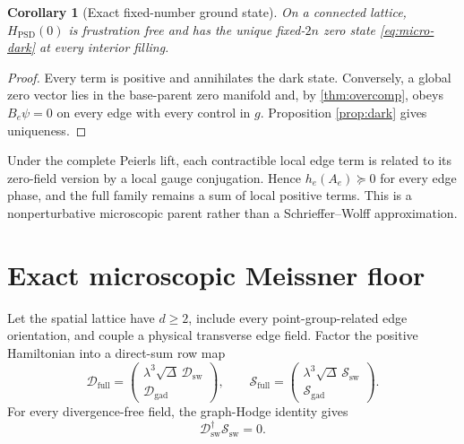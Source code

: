 \documentclass[11pt]{article}
\newtheorem{corollary}[theorem]{Corollary}
\theoremstyle{definition}
\theoremstyle{remark}
\newcommand{\cD}{\mathcal D}
\newcommand{\cS}{\mathcal S}
\begin{document}
\begin{corollary}[Exact fixed-number ground state]
\label{cor:PSD-ground}
On a connected lattice, $H_{\mathrm{PSD}}(0)$ is frustration free and has the unique fixed-$2n$ zero state \eqref{eq:micro-dark} at every interior filling.
\end{corollary}

\begin{proof}
Every term is positive and annihilates the dark state.  Conversely, a global zero vector lies in the base-parent zero manifold and, by \cref{thm:overcomp}, obeys $B_e\psi=0$ on every edge with every control in $g$.  Proposition \ref{prop:dark} gives uniqueness.
\end{proof}

Under the complete Peierls lift, each contractible local edge term is related to its zero-field version by a local gauge conjugation.  Hence $h_e(A_e)\succeq0$ for every edge phase, and the full family remains a sum of local positive terms.  This is a nonperturbative microscopic parent rather than a Schrieffer--Wolff approximation.

\section{Exact microscopic Meissner floor}

Let the spatial lattice have $d\ge2$, include every point-group-related edge orientation, and couple a physical transverse edge field.  Factor the positive Hamiltonian into a direct-sum row map
\begin{equation}
 \cD_{\mathrm{full}}=
 \begin{pmatrix}
 \lambda^3\sqrt\Delta\,\cD_{\mathrm{sw}}\\
 \cD_{\mathrm{gad}}
 \end{pmatrix},
 \qquad
 \cS_{\mathrm{full}}=
 \begin{pmatrix}
 \lambda^3\sqrt\Delta\,\cS_{\mathrm{sw}}\\
 \cS_{\mathrm{gad}}
 \end{pmatrix}.
 \label{eq:row-stack}
\end{equation}
For every divergence-free field, the graph-Hodge identity gives
\begin{equation}
 \cD_{\mathrm{sw}}^\dagger\cS_{\mathrm{sw}}=0.
 \label{eq:sw-kernel}
\end{equation}
\end{document}
